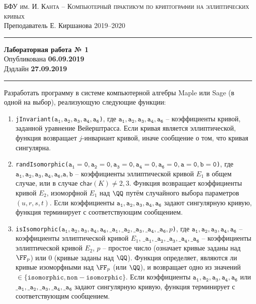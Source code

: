 \documentclass[11pt]{exam}
\theoremstyle{definition}
\renewcommand{\char}{\ensuremath{\mathsf{char}}}
\begin{document}
	
	{\noindent
		\textsc{БФУ им. И. Канта -- Компьютерный практикум по криптографии на эллиптических кривых }\\[5pt]
		Преподаватель {Е. Киршанова}   \hfill{2019--2020\\}
	\hrule
	\begin{center}
		{\LARGE\textbf{
				Лабораторная работа № 1 \\[5pt]
		}} 
			Опубликована \textbf{06.09.2019} \\[5pt] 
			Дэдлайн \textbf{27.09.2019}
		
	\end{center}
	\hrule \vspace{5mm}
	
	\thispagestyle{empty}
	
	Разработать программу в системе компьютерной алгебры Maple или Sage (в одной на выбор), реализующую следующие функции:
	
	\begin{enumerate}
		\item \texttt{jInvariant($\mathtt{a_1, a_2, a_3, a_4, a_6}$)}, где $\mathtt{a_1, a_2, a_3, a_4, a_6}$ -- коэффициенты кривой, заданной уравнение Вейерштрасса. Если кривая является эллиптической, функция возвращает $j$-инвариант кривой, иначе сообщение о том, что кривая сингулярна.
		
		\item \texttt{randIsomorphic($\mathtt{a_1=0, a_2=0, a_3=0, a_4=0, a_6=0, a=0, b=0}$)}, где $\mathtt{a_1, a_2, a_3, a_4, a_6}$,$ \mathtt{a,b}$ -- коэффициенты эллиптической кривой $E_1$ в общем случае, или в случае $\char(K) \neq 2,3$. Функция возвращает коэффициенты кривой $E_2$, изоморфной  $E_1$ над $\QQ$ путём случайного выбора параметров $(u,r,s,t)$. Если коэффициенты $\mathtt{a_1, a_2, a_3, a_4, a_6}$ задают сингулярную кривую, функция терминирует с соответствующим сообщением.
		
		\item \texttt{isIsomorphic($\mathtt{a_1, a_2, a_3, a_4, a_6, \_a_1, \_a_2, \_a_3, \_a_4, \_a_6}, p$)}, где $\mathtt{a_1, a_2, a_3, a_4, a_6}$ -- коэффициенты эллиптической кривой $E_1$, $\mathtt{\_a_1, \_a_2, \_a_3, \_a_4, \_a_6}$ -- коэффициенты эллиптической кривой $E_2$, $p$ -- простое число (означает кривые заданы над $\FF_p$) или $0$ (кривые заданы над $\QQ$). Функция определяет, являются ли кривые изоморфными над $\FF_p$ (или $\QQ$), и возвращает одно из значений $\in \{ \mathtt{isomorphic}, \mathtt{non-isomorphic} \}$.
		Если коэффициенты $\mathtt{a_1, a_2, a_3, a_4, a_6}$ или $\mathtt{\_a_1, \_a_2, \_a_3, \_a_4, \_a_6}$ задают сингулярную кривую, функция терминирует с соответствующим сообщением.
		

\end{enumerate}}
\end{document}
